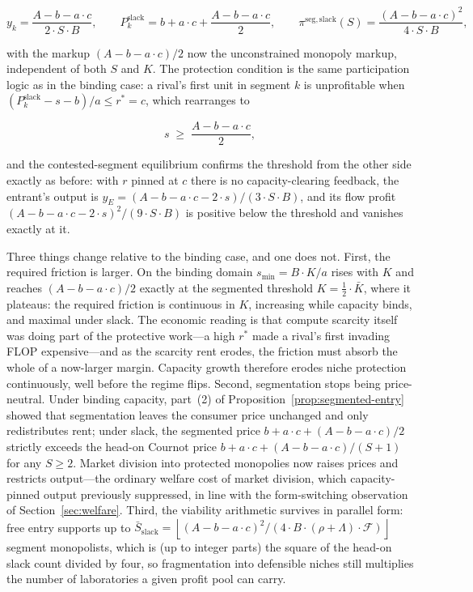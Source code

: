 \documentclass[11pt]{article}
\begin{document}
\begin{equation}y_k=\frac{A-b-a\cdot c}{2\cdot S\cdot B},\qquad P_k^{\mathrm{slack}}=b+a\cdot c+\frac{A-b-a\cdot c}{2},\qquad \pi^{\mathrm{seg,slack}}(S)=\frac{(A-b-a\cdot c)^{2}}{4\cdot S\cdot B},\end{equation}

with the markup $(A-b-a\cdot c)/2$ now the unconstrained monopoly markup, independent of both $S$ and $K$. The protection condition is the same participation logic as in the binding case: a rival's first unit in segment $k$ is unprofitable when $(P_k^{\mathrm{slack}}-s-b)/a\leq r^{*}=c$, which rearranges to

\begin{equation}s\;\geq\;\frac{A-b-a\cdot c}{2},\end{equation}

and the contested-segment equilibrium confirms the threshold from the other side exactly as before: with $r$ pinned at $c$ there is no capacity-clearing feedback, the entrant's output is $y_E=(A-b-a\cdot c-2\cdot s)/(3\cdot S\cdot B)$, and its flow profit $(A-b-a\cdot c-2\cdot s)^{2}/(9\cdot S\cdot B)$ is positive below the threshold and vanishes exactly at it.

Three things change relative to the binding case, and one does not. First, the required friction is larger. On the binding domain $s_{\min}=B\cdot K/a$ rises with $K$ and reaches $(A-b-a\cdot c)/2$ exactly at the segmented threshold $K=\frac12\cdot\bar K$, where it plateaus: the required friction is continuous in $K$, increasing while capacity binds, and maximal under slack. The economic reading is that compute scarcity itself was doing part of the protective work---a high $r^{*}$ made a rival's first invading FLOP expensive---and as the scarcity rent erodes, the friction must absorb the whole of a now-larger margin. Capacity growth therefore erodes niche protection continuously, well before the regime flips. Second, segmentation stops being price-neutral. Under binding capacity, part~(2) of Proposition~\ref{prop:segmented-entry} showed that segmentation leaves the consumer price unchanged and only redistributes rent; under slack, the segmented price $b+a\cdot c+(A-b-a\cdot c)/2$ strictly exceeds the head-on Cournot price $b+a\cdot c+(A-b-a\cdot c)/(S+1)$ for any $S\geq2$. Market division into protected monopolies now raises prices and restricts output---the ordinary welfare cost of market division, which capacity-pinned output previously suppressed, in line with the form-switching observation of Section~\ref{sec:welfare}. Third, the viability arithmetic survives in parallel form: free entry supports up to $\bar S_{\mathrm{slack}}=\left\lfloor(A-b-a\cdot c)^{2}/(4\cdot B\cdot(\rho+\Lambda)\cdot\mathcal F)\right\rfloor$ segment monopolists, which is (up to integer parts) the square of the head-on slack count divided by four, so fragmentation into defensible niches still multiplies the number of laboratories a given profit pool can carry.
\end{document}
